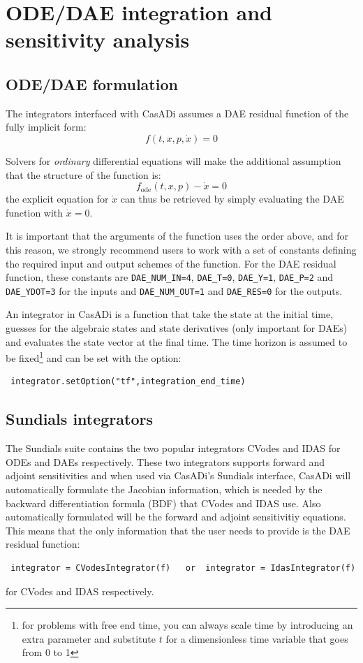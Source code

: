 \documentclass[a4paper,12pt]{book}
\begin{document}
{\chapter{ODE/DAE integration and sensitivity analysis\label{chapter:integrators}}
\section{ODE/DAE formulation}
The integrators interfaced with CasADi assumes a DAE residual function of the fully implicit form:
\begin{equation}
 f(t,x,p,\dot{x}) = 0
\end{equation}

Solvers for \emph{ordinary} differential equations will make the additional assumption that the structure of the function is:
\begin{equation}
 f_{\text{ode}}(t,x,p) - \dot{x} = 0
\end{equation}
the explicit equation for $\dot{x}$ can thus be retrieved by simply evaluating the DAE function with $\dot{x} = 0$.

It is important that the arguments of the function uses the order above, and for this reason, we strongly recommend users to work with a set of constants defining the required input and output schemes of the function. For the DAE residual function, these constants are \texttt{DAE\_NUM\_IN=4}, \texttt{DAE\_T=0}, \texttt{DAE\_Y=1}, \texttt{DAE\_P=2} and \texttt{DAE\_YDOT=3} for the inputs and \texttt{DAE\_NUM\_OUT=1} and \texttt{DAE\_RES=0} for the outputs.

An integrator in CasADi is a function that take the state at the initial time, guesses for the algebraic states and state derivatives (only important for DAEs) and evaluates the state vector at the final time. The time horizon is assumed to be fixed\footnote{for problems with free end time, you can always scale time by introducing an extra parameter and substitute $t$ for a dimensionless time variable that goes from 0 to 1} and can be set with the option:
\begin{verbatim}
 integrator.setOption("tf",integration_end_time)
\end{verbatim}

\section{Sundials integrators}
The Sundials suite contains the two popular integrators CVodes and IDAS for ODEs and DAEs respectively. These two integrators supports forward and adjoint sensitivities and when used via CasADi's Sundials interface, CasADi will automatically formulate the Jacobian information, which is needed by the backward differentiation formula (BDF) that CVodes and IDAS use. Also automatically formulated will be the forward and adjoint sensitivitiy equations. This means that the only information that the user needs to provide is the DAE residual function:
\begin{verbatim}
 integrator = CVodesIntegrator(f)   or  integrator = IdasIntegrator(f)
\end{verbatim}
for CVodes and IDAS respectively.

}
\end{document}
